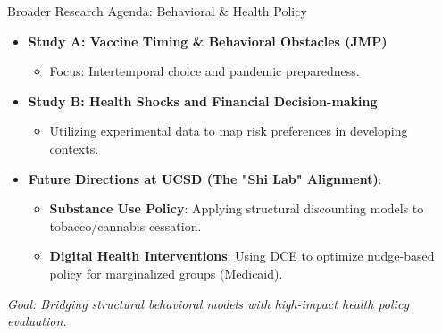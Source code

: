 \begin{frame}{Broader Research Agenda: Behavioral \& Health Policy}
    \begin{itemize}
        \item \textbf{Study A: Vaccine Timing \& Behavioral Obstacles (JMP)}
            \begin{itemize}
                \item Focus: Intertemporal choice and pandemic preparedness.
            \end{itemize}
        \item \textbf{Study B: Health Shocks and Financial Decision-making}
            \begin{itemize}
                \item Utilizing experimental data to map risk preferences in developing contexts.
            \end{itemize}
        \item \textbf{Future Directions at UCSD (The "Shi Lab" Alignment)}:
            \begin{itemize}
                \item \textbf{Substance Use Policy}: Applying structural discounting models to tobacco/cannabis cessation.
                \item \textbf{Digital Health Interventions}: Using DCE to optimize nudge-based policy for marginalized groups (Medicaid).
            \end{itemize}
    \end{itemize}
    \vfill
    \begin{center}
        \textit{Goal: Bridging structural behavioral models with high-impact health policy evaluation.}
    \end{center}
\end{frame}

